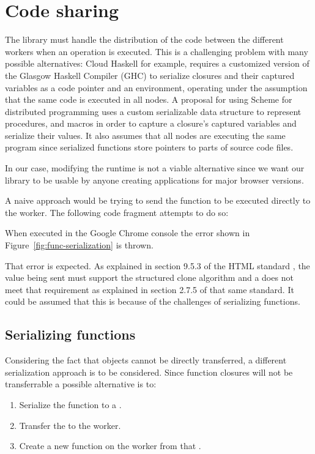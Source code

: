 \section{Code sharing}
The library must handle the distribution of the code between the different workers when an operation is executed. This is a challenging problem with many possible alternatives: Cloud Haskell \cite{cloud-haskell} for example, requires a customized version of the Glasgow Haskell Compiler (GHC) to serialize closures and their captured variables as a code pointer and an environment, operating under the assumption that the same code is executed in all nodes. A proposal for using Scheme for distributed programming \cite{distributed-scheme} uses a custom serializable data structure to represent procedures, and macros in order to capture a closure's captured variables and serialize their values. It also assumes that all nodes are executing the same program since serialized functions store pointers to parts of source code files.

In our case, modifying the runtime is not a viable alternative since we want our library to be usable by anyone creating applications for major browser versions.

A naive approach would be trying to send the function to be executed directly to the worker. The following code fragment attempts to do so:


When executed in the Google Chrome console the error shown in Figure~\ref{fig:func-serialization} is thrown.

That error is expected. As explained in section 9.5.3 of the HTML standard \cite{html-whatwg}, the value being sent must support the structured clone algorithm and a  does not meet that requirement as explained in section 2.7.5 of that same standard. It could be assumed that this is because of the challenges of serializing functions.

\subsection{Serializing functions}
Considering the fact that \tfunction{} objects cannot be directly transferred, a different serialization approach is to be considered. Since function closures will not be transferrable a possible alternative is to:
\begin{enumerate}
  \item Serialize the function to a \tstring{}.
  \item Transfer the \tstring{} to the worker.
  \item Create a new function on the worker from that \tstring{}.
\end{enumerate}

